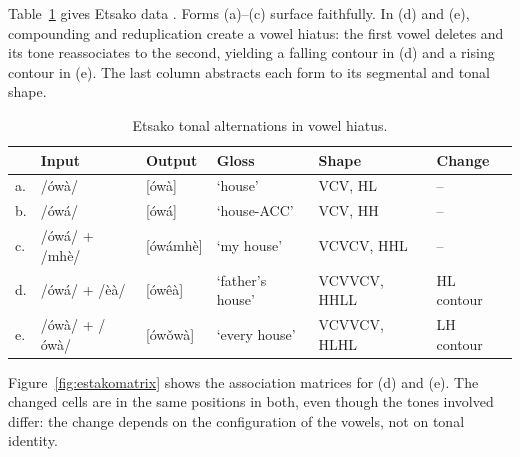 Table~\ref{tab:estako} gives Etsako data \citep{elimelech1976tonal}.
Forms (a)--(c) surface faithfully. In (d) and (e), compounding and
reduplication create a vowel hiatus: the first vowel deletes and its
tone reassociates to the second, yielding a falling contour in (d) and a
rising contour in (e). The last column abstracts each form to its
segmental and tonal shape.

\begin{table}[t]
	\centering\small
	\begin{tabular}{llllll}
		\toprule
		& \textbf{Input} & \textbf{Output} & \textbf{Gloss} & \textbf{Shape} & \textbf{Change} \\
		\midrule
		a. & /\'ow\`a/ & [\'ow\`a] & `house' & VCV, HL & -- \\
		b. & /\'ow\'a/ & [\'ow\'a] & `house-ACC' & VCV, HH & -- \\
		c. & /\'ow\'a/ + /mh\`e/ & [\'ow\'amh\`e] & `my house' & VCVCV, HHL & -- \\
		d. & /\'ow\'a/ + /\`e\texttheta\`a/ & [\'ow\^e\texttheta\`a] & `father's house' & VCVVCV, HHLL & HL contour \\
		e. & /\'ow\`a/ + /\'ow\`a/ & [\'ow\v{o}w\`a] & `every house' & VCVVCV, HLHL & LH contour \\
		\bottomrule
	\end{tabular}
	\caption{Etsako tonal alternations in vowel hiatus.}
	\label{tab:estako}
\end{table}

Figure~\ref{fig:estakomatrix} shows the association matrices for (d) and
(e). The changed cells are in the same positions in both, even though
the tones involved differ: the change depends on the configuration of
the vowels, not on tonal identity.

